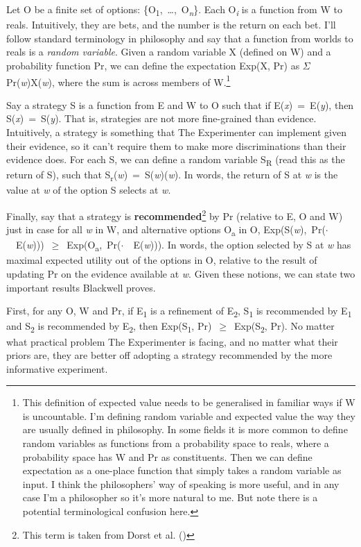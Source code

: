 \documentclass[
  12pt,
  letterpaper,
  DIV=11,
  numbers=noendperiod]{scrartcl}
\begin{document}
Let O be a finite set of options:
\{O\textsubscript{1},~\ldots,~O\textsubscript{\emph{n}}\}. Each
O\textsubscript{\emph{i}} is a function from W to reals. Intuitively,
they are bets, and the number is the return on each bet. I'll follow
standard terminology in philosophy and say that a function from worlds
to reals is a \emph{random variable}. Given a random variable X (defined
on W) and a probability function Pr, we can define the expectation
Exp(X, Pr) as $\Sigma$Pr(\emph{w})X(\emph{w}), where the sum is across members
of W.\footnote{This definition of expected value needs to be generalised
  in familiar ways if W is uncountable. I'm defining random variable and
  expected value the way they are usually defined in philosophy. In some
  fields it is more common to define random variables as functions from
  a probability space to reals, where a probability space has W and Pr
  as constituents. Then we can define expectation as a one-place
  function that simply takes a random variable as input. I think the
  philosophers' way of speaking is more useful, and in any case I'm a
  philosopher so it's more natural to me. But note there is a potential
  terminological confusion here.}

Say a strategy S is a function from E and W to O such that if
E(\emph{x})~=~E(\emph{y}), then S(\emph{x})~=~S(\emph{y}). That is,
strategies are not more fine-grained than evidence. Intuitively, a
strategy is something that The Experimenter can implement given their
evidence, so it can't require them to make more discriminations than
their evidence does. For each S, we can define a random variable
S\textsubscript{R} (read this as the return of S), such that
S\textsubscript{r}(\emph{w})~=~S(\emph{w})(\emph{w}). In words, the
return of S at \emph{w} is the value at \emph{w} of the option S selects
at \emph{w}.

Finally, say that a strategy is \textbf{recommended}\footnote{This term
  is taken from Dorst et al. ()} by Pr
(relative to E, O and W) just in case for all \emph{w} in W, and
alternative options O\textsubscript{a} in O,
Exp(S(\emph{w}),~Pr($\cdot$~\textbar~E(\emph{w})))~$\geq$~Exp(O\textsubscript{a},~Pr($\cdot$~\textbar~E(\emph{w}))).
In words, the option selected by S at \emph{w} has maximal expected
utility out of the options in O, relative to the result of updating Pr
on the evidence available at \emph{w}. Given these notions, we can state
two important results Blackwell proves.

First, for any O, W and Pr, if E\textsubscript{1} is a refinement of
E\textsubscript{2}, S\textsubscript{1} is recommended by
E\textsubscript{1} and S\textsubscript{2} is recommended by
E\textsubscript{2}, then Exp(S\textsubscript{1},
Pr)~$\geq$~Exp(S\textsubscript{2}, Pr). No matter what practical problem The
Experimenter is facing, and no matter what their priors are, they are
better off adopting a strategy recommended by the more informative
experiment.
\end{document}
